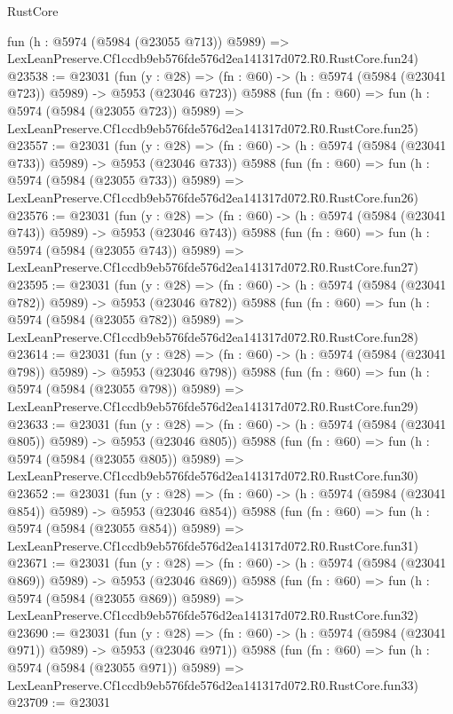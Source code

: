 \begin{lexlean}{RustCore}
\begin{coremodule}
    fun (h : @5974 (@5984 (@23055 @713)) @5989) =>
    LexLeanPreserve.Cf1ccdb9eb576fde576d2ea141317d072.R0.RustCore.fun24)
@23538 := @23031
    (fun (y : @28) => (fn : @60) -> (h : @5974 (@5984 (@23041 @723)) @5989) -> @5953 (@23046 @723))
    @5988
    (fun (fn : @60) =>
    fun (h : @5974 (@5984 (@23055 @723)) @5989) =>
    LexLeanPreserve.Cf1ccdb9eb576fde576d2ea141317d072.R0.RustCore.fun25)
@23557 := @23031
    (fun (y : @28) => (fn : @60) -> (h : @5974 (@5984 (@23041 @733)) @5989) -> @5953 (@23046 @733))
    @5988
    (fun (fn : @60) =>
    fun (h : @5974 (@5984 (@23055 @733)) @5989) =>
    LexLeanPreserve.Cf1ccdb9eb576fde576d2ea141317d072.R0.RustCore.fun26)
@23576 := @23031
    (fun (y : @28) => (fn : @60) -> (h : @5974 (@5984 (@23041 @743)) @5989) -> @5953 (@23046 @743))
    @5988
    (fun (fn : @60) =>
    fun (h : @5974 (@5984 (@23055 @743)) @5989) =>
    LexLeanPreserve.Cf1ccdb9eb576fde576d2ea141317d072.R0.RustCore.fun27)
@23595 := @23031
    (fun (y : @28) => (fn : @60) -> (h : @5974 (@5984 (@23041 @782)) @5989) -> @5953 (@23046 @782))
    @5988
    (fun (fn : @60) =>
    fun (h : @5974 (@5984 (@23055 @782)) @5989) =>
    LexLeanPreserve.Cf1ccdb9eb576fde576d2ea141317d072.R0.RustCore.fun28)
@23614 := @23031
    (fun (y : @28) => (fn : @60) -> (h : @5974 (@5984 (@23041 @798)) @5989) -> @5953 (@23046 @798))
    @5988
    (fun (fn : @60) =>
    fun (h : @5974 (@5984 (@23055 @798)) @5989) =>
    LexLeanPreserve.Cf1ccdb9eb576fde576d2ea141317d072.R0.RustCore.fun29)
@23633 := @23031
    (fun (y : @28) => (fn : @60) -> (h : @5974 (@5984 (@23041 @805)) @5989) -> @5953 (@23046 @805))
    @5988
    (fun (fn : @60) =>
    fun (h : @5974 (@5984 (@23055 @805)) @5989) =>
    LexLeanPreserve.Cf1ccdb9eb576fde576d2ea141317d072.R0.RustCore.fun30)
@23652 := @23031
    (fun (y : @28) => (fn : @60) -> (h : @5974 (@5984 (@23041 @854)) @5989) -> @5953 (@23046 @854))
    @5988
    (fun (fn : @60) =>
    fun (h : @5974 (@5984 (@23055 @854)) @5989) =>
    LexLeanPreserve.Cf1ccdb9eb576fde576d2ea141317d072.R0.RustCore.fun31)
@23671 := @23031
    (fun (y : @28) => (fn : @60) -> (h : @5974 (@5984 (@23041 @869)) @5989) -> @5953 (@23046 @869))
    @5988
    (fun (fn : @60) =>
    fun (h : @5974 (@5984 (@23055 @869)) @5989) =>
    LexLeanPreserve.Cf1ccdb9eb576fde576d2ea141317d072.R0.RustCore.fun32)
@23690 := @23031
    (fun (y : @28) => (fn : @60) -> (h : @5974 (@5984 (@23041 @971)) @5989) -> @5953 (@23046 @971))
    @5988
    (fun (fn : @60) =>
    fun (h : @5974 (@5984 (@23055 @971)) @5989) =>
    LexLeanPreserve.Cf1ccdb9eb576fde576d2ea141317d072.R0.RustCore.fun33)
@23709 := @23031

\end{coremodule}
\end{lexlean}
